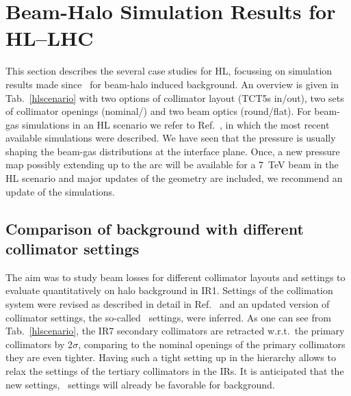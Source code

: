 \section{Beam-Halo Simulation Results for HL--LHC\label{hllhcResults}}


This section describes the several case studies for HL, focussing on simulation results made since~\cite{kweeIpac14} for beam-halo induced background. An overview is given in Tab.~\ref{hlscenario} with two options of collimator layout (TCT5s in/out), two sets of collimator openings (nominal/\twosigmaret) and two beam optics (round/flat). For beam-gas simulations in an HL scenario we refer to Ref.~\cite{kweeIpac14}, in which the most recent available simulations were described. We have seen that the pressure is usually shaping the beam-gas distributions at the interface plane. Once, a new pressure map possibly extending up to the arc will be available for a 7~TeV beam in the HL scenario and major updates of the geometry are included, we recommend an update of the simulations. 

\subsection{Comparison of background with different collimator settings}

The aim was to study beam losses for different collimator layouts and settings to evaluate quantitatively on halo background in IR1. Settings of the collimation system were revised as described in detail in Ref.~\cite{collSettRef} and an updated version of collimator settings, the so-called \twosigmaret~settings, were inferred. As one can see from Tab.~\ref{hlscenario}, the IR7 secondary collimators are retracted w.r.t.~the primary collimators by 2$\sigma$, comparing to the nominal openings of the primary collimators they are even tighter. Having such a tight setting up in the hierarchy allows to relax the settings of the tertiary collimators in the IRs. It is anticipated that the new settings, \twosigmaret~settings will already be favorable for background.

